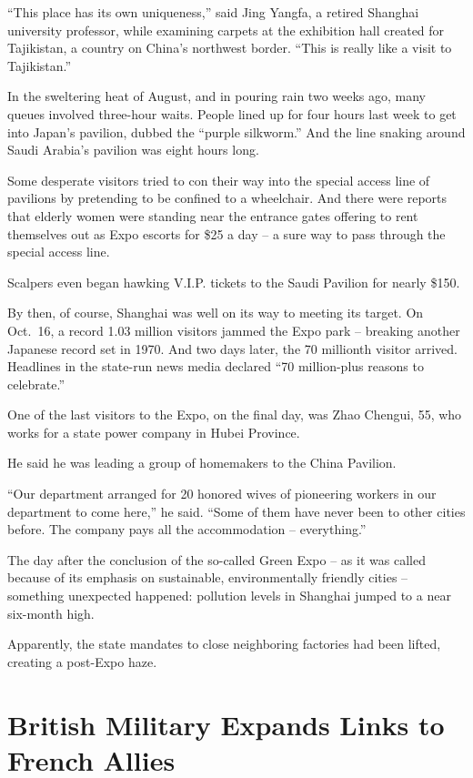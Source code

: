 ﻿\documentclass[12pt]{article}
\begin{document}
``This place has its own uniqueness,'' said Jing Yangfa, a retired Shanghai university professor,
while examining carpets at the exhibition hall created for Tajikistan, a country on China's
northwest border. ``This is really like a visit to Tajikistan.''

In the sweltering heat of August, and in pouring rain two weeks ago, many queues involved three-hour
waits. People lined up for four hours last week to get into Japan's pavilion, dubbed the ``purple
silkworm.'' And the line snaking around Saudi Arabia's pavilion was eight hours long.

Some desperate visitors tried to con their way into the special access line of pavilions by
pretending to be confined to a wheelchair. And there were reports that elderly women were standing
near the entrance gates offering to rent themselves out as Expo escorts for \$25 a day -- a sure way
to pass through the special access line.

Scalpers even began hawking V.I.P. tickets to the Saudi Pavilion for nearly \$150.

By then, of course, Shanghai was well on its way to meeting its target. On Oct.~16, a record 1.03
million visitors jammed the Expo park -- breaking another Japanese record set in 1970. And two days
later, the 70 millionth visitor arrived. Headlines in the state-run news media declared ``70
million-plus reasons to celebrate.''

One of the last visitors to the Expo, on the final day, was Zhao Chengui, 55, who works for a state
power company in Hubei Province.

He said he was leading a group of homemakers to the China Pavilion.

``Our department arranged for 20 honored wives of pioneering workers in our department to come
here,'' he said. ``Some of them have never been to other cities before. The company pays all the
accommodation -- everything.''

The day after the conclusion of the so-called Green Expo -- as it was called because of its emphasis
on sustainable, environmentally friendly cities -- something unexpected happened: pollution levels
in Shanghai jumped to a near six-month high.

Apparently, the state mandates to close neighboring factories had been lifted, creating a post-Expo
haze.

\section{British Military Expands Links to French Allies}
\end{document}
